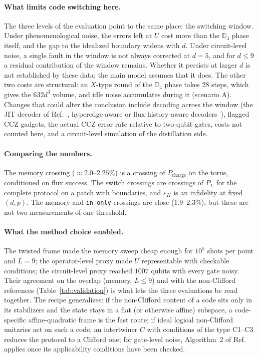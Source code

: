 \documentclass[a4paper]{article}
\newcommand{\cs}[1]{\texttt{#1}}
\newcommand{\Pch}{P_{\mathrm{charge}}}
\newcommand{\epsK}{\varepsilon_K}
\begin{document}
\paragraph{What limits code switching here.}
The three levels of the evaluation point to the same place: the switching window. Under phenomenological noise, the errors left at $U$ cost more than the $\mathbb{D}_4$ phase itself, and the gap to the idealized boundary widens with $d$. Under circuit-level noise, a single fault in the window is not always corrected at $d=5$, and for $d\le9$ a residual contribution of the window remains. Whether it persists at larger $d$ is not established by these data; the main model assumes that it does. The other two costs are structural: an $X$-type round of the $\mathbb{D}_4$ phase takes 28 steps, which gives the $632d^3$ volume, and idle noise accumulates during it (scenario A). Changes that could alter the conclusion include decoding across the window (the JIT decoder of Ref.~\cite{davydova2025knots}, hyperedge-aware or flux-history-aware decoders~\cite{magdalena2026}), flagged CCZ gadgets, the actual CCZ error rate relative to two-qubit gates, costs not counted here, and a circuit-level simulation of the distillation side.

\paragraph{Comparing the numbers.}
The memory crossing ($\approx2.0$--$2.25\%$) is a crossing of $\Pch$ on the torus, conditioned on flux success. The switch crossings are crossings of $P_L$ for the complete protocol on a patch with boundaries, and $\epsK$ is an infidelity at fixed $(d,p)$. The memory and \cs{in\_only} crossings are close ($1.9$--$2.3\%$), but these are not two measurements of one threshold.

\paragraph{What the method choice enabled.}
The twisted frame made the memory sweep cheap enough for $10^5$ shots per point and $L=9$; the operator-level proxy made $U$ representable with checkable conditions; the circuit-level proxy reached $1007$ qubits with every gate noisy. Their agreement on the overlap (memory, $L\le9$) and with the non-Clifford references (Table~\ref{tab:validation}) is what lets the three evaluations be read together. The recipe generalizes: if the non-Clifford content of a code sits only in its stabilizers and the state stays in a flat (or otherwise affine) subspace, a code-specific affine-quadratic frame is the fast route; if ideal logical non-Clifford unitaries act on such a code, an intertwiner $C$ with conditions of the type C1--C3 reduces the protocol to a Clifford one; for gate-level noise, Algorithm~2 of Ref.~\cite{takada2026exact} applies once its applicability conditions have been checked.
\end{document}
